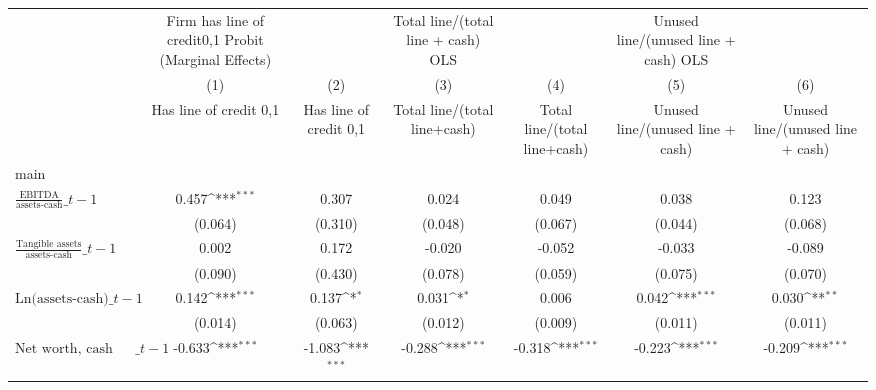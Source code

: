 {
\def\sym#1{\ifmmode^{#1}\else\(^{#1}\)\fi}
\begin{tabular}{l*{6}{c}}
\toprule
                    &Firm has line of credit{0,1} Probit (Marginal Effects)         &                     &Total line/(total line + cash) OLS         &                     &Unused line/(unused line + cash) OLS         &                     \\
                    &\multicolumn{1}{c}{(1)}&\multicolumn{1}{c}{(2)}&\multicolumn{1}{c}{(3)}&\multicolumn{1}{c}{(4)}&\multicolumn{1}{c}{(5)}&\multicolumn{1}{c}{(6)}\\
                    &\multicolumn{1}{c}{Has line of credit {0,1}}&\multicolumn{1}{c}{Has line of credit {0,1}}&\multicolumn{1}{c}{Total line/(total line+cash)}&\multicolumn{1}{c}{Total line/(total line+cash)}&\multicolumn{1}{c}{Unused line/(unused line + cash)}&\multicolumn{1}{c}{Unused line/(unused line + cash)}\\
\midrule
main                &                     &                     &                     &                     &                     &                     \\
$\frac{\text{EBITDA}}{\text{assets-cash}}\_{t-1}$&       0.457\sym{***}&       0.307         &       0.024         &       0.049         &       0.038         &       0.123         \\
                    &     (0.064)         &     (0.310)         &     (0.048)         &     (0.067)         &     (0.044)         &     (0.068)         \\
\addlinespace
$\frac{\text{Tangible assets}}{\text{assets-cash}}\_{t-1}$&       0.002         &       0.172         &      -0.020         &      -0.052         &      -0.033         &      -0.089         \\
                    &     (0.090)         &     (0.430)         &     (0.078)         &     (0.059)         &     (0.075)         &     (0.070)         \\
\addlinespace
$\text{Ln(assets-cash)}\_{t-1}$&       0.142\sym{***}&       0.137\sym{*}  &       0.031\sym{*}  &       0.006         &       0.042\sym{***}&       0.030\sym{**} \\
                    &     (0.014)         &     (0.063)         &     (0.012)         &     (0.009)         &     (0.011)         &     (0.011)         \\
\addlinespace
$\text{Net worth, cash adjusted}\_{t-1}$&      -0.633\sym{***}&      -1.083\sym{***}&      -0.288\sym{***}&      -0.318\sym{***}&      -0.223\sym{***}&      -0.209\sym{***}\\

\end{tabular}}
